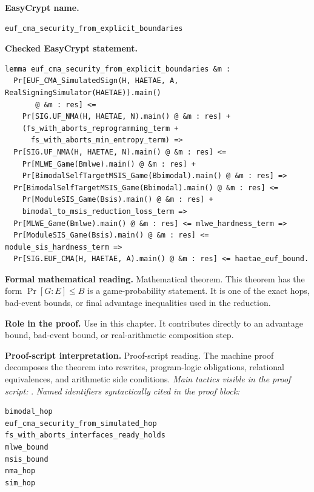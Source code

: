 \begin{formaltheorem}
\noindent\textbf{EasyCrypt name.}
\begin{lstlisting}[language=EasyCrypt,basicstyle=\ttfamily\scriptsize]
euf_cma_security_from_explicit_boundaries
\end{lstlisting}
\noindent\textbf{Checked EasyCrypt statement.}
\begin{lstlisting}[language=EasyCrypt,basicstyle=\ttfamily\scriptsize]
lemma euf_cma_security_from_explicit_boundaries &m :
  Pr[EUF_CMA_SimulatedSign(H, HAETAE, A, RealSigningSimulator(HAETAE)).main()
       @ &m : res] <=
    Pr[SIG.UF_NMA(H, HAETAE, N).main() @ &m : res] +
    (fs_with_aborts_reprogramming_term +
      fs_with_aborts_min_entropy_term) =>
  Pr[SIG.UF_NMA(H, HAETAE, N).main() @ &m : res] <=
    Pr[MLWE_Game(Bmlwe).main() @ &m : res] +
    Pr[BimodalSelfTargetMSIS_Game(Bbimodal).main() @ &m : res] =>
  Pr[BimodalSelfTargetMSIS_Game(Bbimodal).main() @ &m : res] <=
    Pr[ModuleSIS_Game(Bsis).main() @ &m : res] +
    bimodal_to_msis_reduction_loss_term =>
  Pr[MLWE_Game(Bmlwe).main() @ &m : res] <= mlwe_hardness_term =>
  Pr[ModuleSIS_Game(Bsis).main() @ &m : res] <= module_sis_hardness_term =>
  Pr[SIG.EUF_CMA(H, HAETAE, A).main() @ &m : res] <= haetae_euf_bound.
\end{lstlisting}
\noindent\textbf{Formal mathematical reading.}
Mathematical theorem. This theorem has the form \(\Pr[G:E] \le B\) is a game-probability statement.  It is one of the exact hops, bad-event bounds, or final advantage inequalities used in the reduction.

\noindent\textbf{Role in the proof.}
Use in this chapter. It contributes directly to an advantage bound, bad-event bound, or real-arithmetic composition step.

\noindent\textbf{Proof-script interpretation.}
Proof-script reading. The machine proof decomposes the theorem into rewrites, program-logic obligations, relational equivalences, and arithmetic side conditions.
\emph{Main tactics visible in the proof script:} .
\emph{Named identifiers syntactically cited in the proof block:}
\begin{lstlisting}[language=EasyCrypt,basicstyle=\ttfamily\scriptsize]
bimodal_hop
euf_cma_security_from_simulated_hop
fs_with_aborts_interfaces_ready_holds
mlwe_bound
msis_bound
nma_hop
sim_hop
\end{lstlisting}

\end{formaltheorem}


